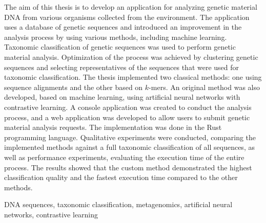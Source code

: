 \clearpage{}

\secondabstract{}
The aim of this thesis is to develop an application for analyzing genetic material DNA from various organisms collected from the environment. The application uses a database of genetic sequences and introduced an improvement in the analysis process by using various methods, including machine learning.
Taxonomic classification of genetic sequences was used to perform genetic material analysis. Optimization of the process was achieved by clustering genetic sequences and selecting representatives of the sequences that were used for taxonomic classification. The thesis implemented two classical methods: one using sequence alignments and the other based on $k$-mers. An original method was also developed, based on machine learning, using artificial neural networks with contrastive learning. A console application was created to conduct the analysis process, and a web application was developed to allow users to submit genetic material analysis requests. The implementation was done in the Rust programming language.
Qualitative experiments were conducted, comparing the implemented methods against a full taxonomic classification of all sequences, as well as performance experiments, evaluating the execution time of the entire process. The results showed that the custom method demonstrated the highest classification quality and the fastest execution time compared to the other methods.

\secondkeywords{}
DNA sequences, taxonomic classification,  metagenomics, artificial neural networks, contrastive learning
